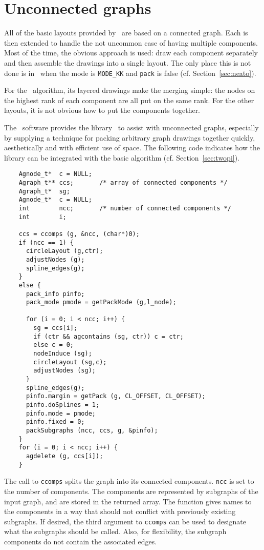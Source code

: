 \section{Unconnected graphs}
\label{sec:unconnect}
All of the basic layouts provided by \gviz\ are based on a connected graph.
Each is then extended to handle the not uncommon case of having
multiple components. Most of the time, the obvious approach is used:
draw each component separately and then assemble the drawings into a single
layout. The only place this is not done is in \neato\ when the mode is
{\tt MODE\_KK} and {\tt pack} is false (cf. Section~\ref{sec:neato}).

For the \dot\ algorithm, its layered drawings make the merging simple:
the nodes on the highest rank of each component are all put
on the same rank. For the other layouts, it is not obvious how to put
the components together. 

The \gviz\ software provides the library \pack\ to assist
with unconnected graphs, especially by supplying a technique for
packing arbitrary graph drawings together quickly, aesthetically and
with efficient use of space. The following code indicates how the
library can be integrated with the 
basic algorithm (cf. Section~\ref{sec:twopi}).

\begin{verbatim}
    Agnode_t*  c = NULL;
    Agraph_t** ccs;       /* array of connected components */
    Agraph_t*  sg;
    Agnode_t*  c = NULL;
    int        ncc;       /* number of connected components */
    int        i;

    ccs = ccomps (g, &ncc, (char*)0);
    if (ncc == 1) {
      circleLayout (g,ctr);
      adjustNodes (g);
      spline_edges(g);
    }
    else {
      pack_info pinfo;
      pack_mode pmode = getPackMode (g,l_node);

      for (i = 0; i < ncc; i++) {
        sg = ccs[i];
        if (ctr && agcontains (sg, ctr)) c = ctr;
        else c = 0;
        nodeInduce (sg);
        circleLayout (sg,c);
        adjustNodes (sg);
      }
      spline_edges(g);
      pinfo.margin = getPack (g, CL_OFFSET, CL_OFFSET);
      pinfo.doSplines = 1;
      pinfo.mode = pmode;
      pinfo.fixed = 0;
      packSubgraphs (ncc, ccs, g, &pinfo);
    }
    for (i = 0; i < ncc; i++) {
      agdelete (g, ccs[i]);
    }
\end{verbatim}

The call to {\tt ccomps} splits the graph into its connected
components. {\tt ncc} is set to the number of components. 
The components are represented by subgraphs of the input graph, and are
stored in the returned array. The function gives names to the components
in a way that should not conflict with previously existing subgraphs.
If desired, the third argument to {\tt ccomps} can be used to designate
what the subgraphs should be called. Also, for flexibility, the
subgraph components do not contain the associated edges.

